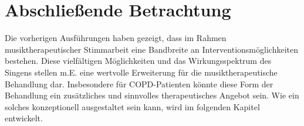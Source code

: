 \section{Abschließende Betrachtung}
Die vorherigen Ausführungen haben gezeigt, dass im Rahmen musiktherapeutischer Stimmarbeit eine Bandbreite an Interventionsmöglichkeiten bestehen. Diese vielfältigen Möglichkeiten und das Wirkungsspektrum des Singens stellen m.E. eine wertvolle Erweiterung für die musiktherapeutische Behandlung dar. Insbesondere für COPD-Patienten könnte diese Form der Behandlung ein zusätzliches und sinnvolles therapeutisches Angebot sein. Wie ein solches konzeptionell ausgestaltet sein kann, wird im folgenden Kapitel entwickelt.



\newpage\thispagestyle{empty}

